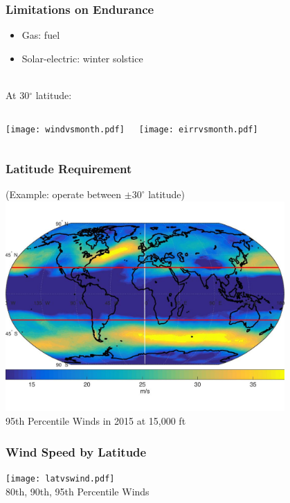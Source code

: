 \documentclass{beamer}
\begin{document}
\begin{frame}
    \frametitle{Limitations on Endurance}

    \begin{itemize}
        \item Gas: fuel 
        \item Solar-electric: winter solstice \\~\\
    \end{itemize}

    
    At 30$^{\circ}$ latitude:
    \begin{columns}
        \texttt{[image: windvsmonth.pdf]}
        
        \texttt{[image: eirrvsmonth.pdf]}
    \end{columns}

\end{frame}

\begin{frame}
    \frametitle{Latitude Requirement}

    \begin{center}
        (Example: operate between $\pm30^{\circ}$ latitude)
        \includegraphics[width=0.8\textwidth]{worldwinds.jpg} \\
        \scriptsize
        95th Percentile Winds in 2015 at 15,000 ft
    \end{center}

\end{frame}

\begin{frame}
    \frametitle{Wind Speed by Latitude}

    \begin{center}
    \texttt{[image: latvswind.pdf]} \\
    \scriptsize
    80th, 90th, 95th Percentile Winds
    \end{center}

\end{frame}
\end{document}
